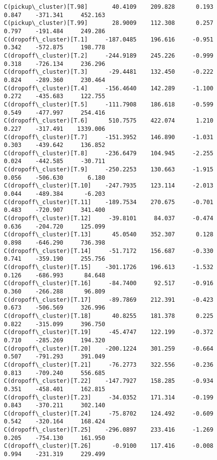 \documentclass[11pt]{article}
\begin{document}
\begin{Verbatim}[commandchars=\\\{\}]
C(pickup\_cluster)[T.98]       40.4109    209.828      0.193      0.847    -371.341     452.163
C(pickup\_cluster)[T.99]       28.9009    112.308      0.257      0.797    -191.484     249.286
C(dropoff\_cluster)[T.1]     -187.0485    196.616     -0.951      0.342    -572.875     198.778
C(dropoff\_cluster)[T.2]     -244.9189    245.226     -0.999      0.318    -726.134     236.296
C(dropoff\_cluster)[T.3]      -29.4481    132.450     -0.222      0.824    -289.360     230.464
C(dropoff\_cluster)[T.4]     -156.4640    142.289     -1.100      0.272    -435.683     122.755
C(dropoff\_cluster)[T.5]     -111.7908    186.618     -0.599      0.549    -477.997     254.416
C(dropoff\_cluster)[T.6]      510.7575    422.074      1.210      0.227    -317.491    1339.006
C(dropoff\_cluster)[T.7]     -151.3952    146.890     -1.031      0.303    -439.642     136.852
C(dropoff\_cluster)[T.8]     -236.6479    104.945     -2.255      0.024    -442.585     -30.711
C(dropoff\_cluster)[T.9]     -250.2253    130.663     -1.915      0.056    -506.630       6.180
C(dropoff\_cluster)[T.10]    -247.7935    123.114     -2.013      0.044    -489.384      -6.203
C(dropoff\_cluster)[T.11]    -189.7534    270.675     -0.701      0.483    -720.907     341.400
C(dropoff\_cluster)[T.12]     -39.8101     84.037     -0.474      0.636    -204.720     125.099
C(dropoff\_cluster)[T.13]      45.0540    352.307      0.128      0.898    -646.290     736.398
C(dropoff\_cluster)[T.14]     -51.7172    156.687     -0.330      0.741    -359.190     255.756
C(dropoff\_cluster)[T.15]    -301.1726    196.613     -1.532      0.126    -686.993      84.648
C(dropoff\_cluster)[T.16]     -84.7400     92.517     -0.916      0.360    -266.288      96.809
C(dropoff\_cluster)[T.17]     -89.7869    212.391     -0.423      0.673    -506.569     326.996
C(dropoff\_cluster)[T.18]      40.8255    181.378      0.225      0.822    -315.099     396.750
C(dropoff\_cluster)[T.19]     -45.4747    122.199     -0.372      0.710    -285.269     194.320
C(dropoff\_cluster)[T.20]    -200.1224    301.259     -0.664      0.507    -791.293     391.049
C(dropoff\_cluster)[T.21]     -76.2773    322.556     -0.236      0.813    -709.240     556.685
C(dropoff\_cluster)[T.22]    -147.7927    158.285     -0.934      0.351    -458.401     162.815
C(dropoff\_cluster)[T.23]     -34.0352    171.314     -0.199      0.843    -370.211     302.140
C(dropoff\_cluster)[T.24]     -75.8702    124.492     -0.609      0.542    -320.164     168.424
C(dropoff\_cluster)[T.25]    -296.0897    233.416     -1.269      0.205    -754.130     161.950
C(dropoff\_cluster)[T.26]      -0.9100    117.416     -0.008      0.994    -231.319     229.499

\end{Verbatim}
\end{document}

